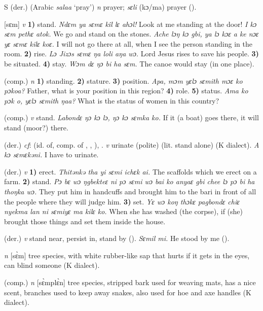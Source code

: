 \begin{letter}{S}
 (der.) (Arabic { }\textit{salaa} ‘pray') \textit{n} prayer; \textit{sɛli} (kɔ/ma) prayer (\citealt{Pichl1967}). 

 [sɛm] \textit{v} \textbf{1)} stand. \textit{Ndɛm ya sɛmɛ kîl lɛ ahɔl!} Look at me standing at the door! \textit{I kɔ sɛm pethɛ atok.} We go and stand on the stones. \textit{Ache lɔŋ kɔ gbi, ya lɔ kɔɛ a ke nɔɛ yɛ sɛmɛ kilɛ koɛ.} I will not go there at all, when I see the person standing in the room. \textbf{2)} rise. \textit{Lɔ Jizɔs sɛmɛ ŋa loli aŋa wɔ.} Lord Jesus rises to save his people. \textbf{3)} be situated. \textbf{4)} stay. \textit{Wɔm dɛ ŋɔ bi ha sɛm.} The canoe would stay (in one place).

 (comp.) \textit{n} \textbf{1)} standing. \textbf{2)} stature. \textbf{3)} position. \textit{Apa, mɔm yɛlɔ sɛmith mɔɛ ko pɔkoa?} Father, what is your position in this region? \textbf{4)} role. \textbf{5)} status. \textit{Ama ko pɔk o, yɛlɔ sɛmith ŋaa?} What is the status of women in this country?

 (comp.) \textit{v} stand. \textit{Labondɛ ŋɔ kɔ lɔ, ŋɔ kɔ sɛmka ko.} If it (a boat) goes there, it will stand (moor?) there. 

 (der.) \textit{cf}:  (id. of, comp. of , , ), . \textit{v} urinate (polite) (lit. stand alone) (K dialect). \textit{A kɔ sɛmɛkəni.} I have to urinate.

 (der.) \textit{v} \textbf{1)} erect. \textit{Thitənkə tha yi sɛmi ichɛk ai.} The scaffolds which we erect on a farm. \textbf{2)} stand. \textit{Pɔ bɛ wɔ ŋgbekteɛ ni pɔ sɛmi wɔ bai ko anyaɛ gbi chee lɔ pɔ bi ha thoŋka wɔ.} They put him in handcuffs and brought him to the bari in front of all the people where they will judge him. \textbf{3)} set. \textit{Yɛ wɔ koŋ thɔkɛ pagbondɛ chiɛ nyekma lan ni sɛmiyɛ ma kilɛ ko.} When she has washed (the corpse), if (she) brought those things and set them inside the house.

 (der.) \textit{v} stand near, persist in, stand by (\citealt{Pichl1967}). \textit{Sɛmil mi.} He stood by me (\citealt{Pichl1967}).

 \textit{n} [sɛ̀m] tree species, with white rubber-like sap that hurts if it gets in the eyes, can blind someone (K dialect). 

 (comp.) \textit{n} [sɛ̀mplɛ̀n] tree species, stripped bark used for weaving mats, has a nice scent, branches used to keep away snakes, also used for hoe and axe handles (K dialect). 


\end{letter}
